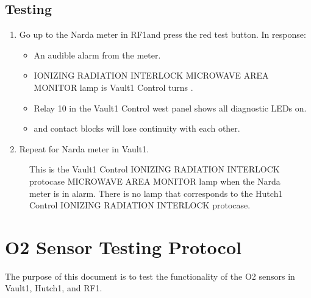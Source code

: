 \documentclass[letterpaper,10pt,english]{sphinxmanual}
\begin{document}
\subsection{Testing}
\label{\detokenize{testing_documentation/narda_testing:testing}}\begin{enumerate}
%
\item {} 
\sphinxAtStartPar
Go up to the Narda meter in RF\sphinxhyphen{}1and press the red test button.
In response:
\begin{itemize}
\item {} 
\sphinxAtStartPar
An audible alarm from the meter.

\item {} 
\sphinxAtStartPar
IONIZING RADIATION INTERLOCK MICROWAVE AREA MONITOR lamp is Vault\sphinxhyphen{}1 Control turns .

\item {} 
\sphinxAtStartPar
Relay 10 in the Vault\sphinxhyphen{}1 Control west panel shows all diagnostic LEDs on.

\item {} 
\sphinxAtStartPar
{} and  contact blocks will lose continuity with each other.

\end{itemize}

\item {} 
\sphinxAtStartPar
Repeat for Narda meter in Vault\sphinxhyphen{}1.

\end{enumerate}

\begin{figure}[htbp]
\centering
\capstart

\noindent{}
\caption{ This is the Vault\sphinxhyphen{}1 Control IONIZING RADIATION INTERLOCK protocase MICROWAVE AREA MONITOR lamp when the Narda meter is in alarm.
There is no lamp that corresponds to the Hutch\sphinxhyphen{}1 Control IONIZING RADIATION INTERLOCK protocase.}\label{\detokenize{testing_documentation/narda_testing:id3}}\end{figure}

\sphinxstepscope


\section{O2 Sensor Testing Protocol}
\label{\detokenize{testing_documentation/O2_testing:o2-sensor-testing-protocol}}\label{\detokenize{testing_documentation/O2_testing::doc}}
\sphinxAtStartPar
The purpose of this document is to test the functionality of the O2 sensors in Vault\sphinxhyphen{}1, Hutch\sphinxhyphen{}1, and RF\sphinxhyphen{}1.
\end{document}
